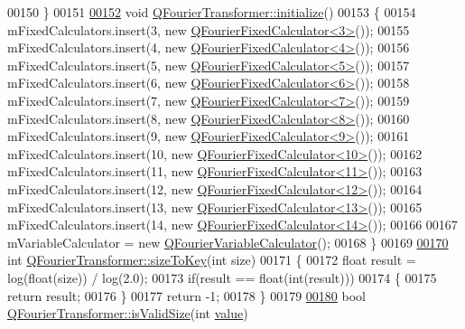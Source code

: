 \begin{DoxyCode}
00150 \}
00151 
\hypertarget{a00121_source_l00152}{}\hyperlink{a00054_a050f813673ba678aefeeafba415c82aa}{00152} \textcolor{keywordtype}{void} \hyperlink{a00054_a050f813673ba678aefeeafba415c82aa}{QFourierTransformer::initialize}()
00153 \{
00154     mFixedCalculators.insert(3, \textcolor{keyword}{new} \hyperlink{a00053}{QFourierFixedCalculator<3>}());
00155     mFixedCalculators.insert(4, \textcolor{keyword}{new} \hyperlink{a00053}{QFourierFixedCalculator<4>}());
00156     mFixedCalculators.insert(5, \textcolor{keyword}{new} \hyperlink{a00053}{QFourierFixedCalculator<5>}());
00157     mFixedCalculators.insert(6, \textcolor{keyword}{new} \hyperlink{a00053}{QFourierFixedCalculator<6>}());
00158     mFixedCalculators.insert(7, \textcolor{keyword}{new} \hyperlink{a00053}{QFourierFixedCalculator<7>}());
00159     mFixedCalculators.insert(8, \textcolor{keyword}{new} \hyperlink{a00053}{QFourierFixedCalculator<8>}());
00160     mFixedCalculators.insert(9, \textcolor{keyword}{new} \hyperlink{a00053}{QFourierFixedCalculator<9>}());
00161     mFixedCalculators.insert(10, \textcolor{keyword}{new} \hyperlink{a00053}{QFourierFixedCalculator<10>}());
00162     mFixedCalculators.insert(11, \textcolor{keyword}{new} \hyperlink{a00053}{QFourierFixedCalculator<11>}());
00163     mFixedCalculators.insert(12, \textcolor{keyword}{new} \hyperlink{a00053}{QFourierFixedCalculator<12>}());
00164     mFixedCalculators.insert(13, \textcolor{keyword}{new} \hyperlink{a00053}{QFourierFixedCalculator<13>}());
00165     mFixedCalculators.insert(14, \textcolor{keyword}{new} \hyperlink{a00053}{QFourierFixedCalculator<14>}());
00166 
00167     mVariableCalculator = \textcolor{keyword}{new} \hyperlink{a00055}{QFourierVariableCalculator}();
00168 \}
00169 
\hypertarget{a00121_source_l00170}{}\hyperlink{a00054_ae8918e95cfd4b0b65bae0947903918ac}{00170} \textcolor{keywordtype}{int} \hyperlink{a00054_ae8918e95cfd4b0b65bae0947903918ac}{QFourierTransformer::sizeToKey}(\textcolor{keywordtype}{int} size)
00171 \{
00172     \textcolor{keywordtype}{float} result = log(\textcolor{keywordtype}{float}(size)) / log(2.0);
00173     \textcolor{keywordflow}{if}(result == \textcolor{keywordtype}{float}(\textcolor{keywordtype}{int}(result)))
00174     \{
00175         \textcolor{keywordflow}{return} result;
00176     \}
00177     \textcolor{keywordflow}{return} -1;
00178 \}
00179 
\hypertarget{a00121_source_l00180}{}\hyperlink{a00054_ac6ce59f26c2e51bc91f16ba42cf059a4}{00180} \textcolor{keywordtype}{bool} \hyperlink{a00054_ac6ce59f26c2e51bc91f16ba42cf059a4}{QFourierTransformer::isValidSize}(\textcolor{keywordtype}{int} \hyperlink{a00116_aee90379adb0307effb138f4871edbc5c}{value})

\end{DoxyCode}
